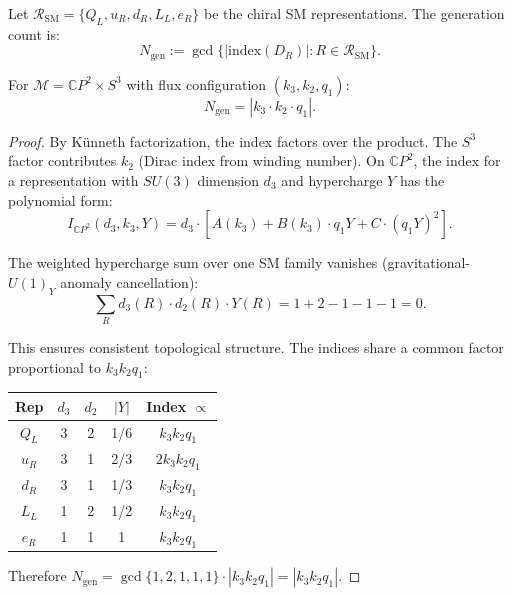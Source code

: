 \begin{definition}
Let $\mathcal{R}_{\text{SM}} = \{Q_L, u_R, d_R, L_L, e_R\}$ be the chiral SM representations. The generation count is:
\begin{equation}
N_{\text{gen}} := \gcd\{|\text{index}(D_R)| : R \in \mathcal{R}_{\text{SM}}\}.
\end{equation}
\end{definition}

\begin{theorem}\label{thm:flux-product}
For $\mathcal{M} = \mathbb{C}P^2 \times S^3$ with flux configuration $(k_3, k_2, q_1)$:
\begin{equation}
N_{\text{gen}} = |k_3 \cdot k_2 \cdot q_1|.
\end{equation}
\end{theorem}

\begin{proof}
By K\"unneth factorization, the index factors over the product. The $S^3$ factor contributes $k_2$ (Dirac index from winding number). On $\mathbb{C}P^2$, the index for a representation with $SU(3)$ dimension $d_3$ and hypercharge $Y$ has the polynomial form:
\begin{equation}
I_{\mathbb{C}P^2}(d_3, k_3, Y) = d_3 \cdot [A(k_3) + B(k_3) \cdot q_1 Y + C \cdot (q_1 Y)^2].
\end{equation}

The weighted hypercharge sum over one SM family vanishes (gravitational-$U(1)_Y$ anomaly cancellation):
\begin{equation}
\sum_R d_3(R) \cdot d_2(R) \cdot Y(R) = 1 + 2 - 1 - 1 - 1 = 0.
\end{equation}

This ensures consistent topological structure. The indices share a common factor proportional to $k_3 k_2 q_1$:

\begin{center}
\renewcommand{\arraystretch}{1.1}
\begin{tabular}{ccccc}
\toprule
Rep & $d_3$ & $d_2$ & $|Y|$ & Index $\propto$ \\
\midrule
$Q_L$ & 3 & 2 & 1/6 & $k_3 k_2 q_1$ \\
$u_R$ & 3 & 1 & 2/3 & $2 k_3 k_2 q_1$ \\
$d_R$ & 3 & 1 & 1/3 & $k_3 k_2 q_1$ \\
$L_L$ & 1 & 2 & 1/2 & $k_3 k_2 q_1$ \\
$e_R$ & 1 & 1 & 1 & $k_3 k_2 q_1$ \\
\bottomrule
\end{tabular}
\end{center}

Therefore $N_{\text{gen}} = \gcd\{1,2,1,1,1\} \cdot |k_3 k_2 q_1| = |k_3 k_2 q_1|$.
\end{proof}

